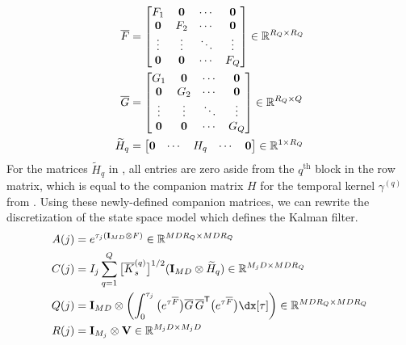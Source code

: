 \documentclass[10pt]{article}
\numberwithin{equation}{section}
\begin{document}
\begin{subequations}
    \label{eq:MOGP-companion-matrices}
    \begin{align}
        \overline{F} &= \begin{bmatrix}
            F_{1} & \mathbf{0} & \cdots & \mathbf{0}\\
            \mathbf{0} & F_{2} & \cdots & \mathbf{0}\\
            \vdots & \vdots & \ddots & \vdots\\
            \mathbf{0} & \mathbf{0} & \cdots & F_{Q}
        \end{bmatrix} \in \mathbb{R}^{R_{Q} \times R_{Q}} \label{eq:MOGP-companion-F}\\
        \overline{G} &= \begin{bmatrix}
            G_{1} & \mathbf{0} & \cdots & \mathbf{0}\\
            \mathbf{0} & G_{2} & \cdots & \mathbf{0}\\
            \vdots & \vdots & \ddots & \vdots\\
            \mathbf{0} & \mathbf{0} & \cdots & G_{Q}
        \end{bmatrix} \in \mathbb{R}^{R_{Q} \times Q} \label{eq:MOGP-companion-G}\\
        \widetilde{H}_{q} &= \begin{bmatrix}
            \mathbf{0} & \cdots & H_{q} & \cdots & \mathbf{0}
        \end{bmatrix} \in \mathbb{R}^{1 \times R_{Q}} \label{eq:MOGP-companion-Hq}
    \end{align}
\end{subequations}
For the matrices $\widetilde{H}_{q}$ in , all entries are zero aside from the $q^{\textrm{th}}$ block in the row matrix, which is equal to the companion matrix $H$ for the temporal kernel $\gamma^{(q)}$ from . Using these newly-defined companion matrices, we can rewrite the discretization of the state space model which defines the Kalman filter.
\begin{subequations}
    \label{eq:MOGP-discretize-parameters}
    \begin{align}
        A(j) &= e^{\tau_{j}(\bfI_{MD} \otimes F)} \in \bbR^{MDR_{Q} \times MDR_{Q}} \label{eq:MOGP-discretize-Aj}\\
        C(j) &= I_{j}\sum_{q=1}^{Q}\big[\overline{K}_{s}^{(q)}\big]^{1/2}(\bfI_{MD} \otimes \widetilde{H}_{q}) \in \bbR^{M_{j}D \times MDR_{Q}} \label{eq:MOGP-discretize-Cj}\\
        Q(j) &= \bfI_{MD} \otimes \left(\int_{0}^{\tau_{j}}\big(e^{\tau\overline{F}}\big)\overline{G}\,\overline{G}^{\sfTsmall}\big(e^{\tau\overline{F}}\big)\dx[\tau]\right) \in \bbR^{MDR_{Q} \times MDR_{Q}} \label{eq:MOGP-discretize-Qj}\\
        R(j) &= \bfI_{M_{j}} \otimes \bfV \in \bbR^{M_{j}D \times M_{j}D} \label{eq:MOGP-discretize-Rj}
    \end{align}
\end{subequations}
\end{document}
